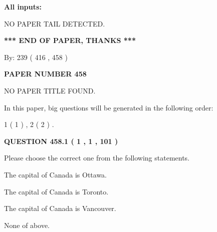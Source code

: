 \documentclass[12pt]{article}
\begin{document}
   
   
   
\noindent\vspace{0.1in}\hspace{-0.08in} {\textbf{\Large{All inputs: }}}
   
   
   
   
\vspace{2.0in} NO PAPER TAIL DETECTED.
   
   
   
   
\vspace{1.0in} 
{\textbf{\large{ *** END OF PAPER, THANKS *** }}} 
   
   
\hspace{1.0in} By: 
 239 ( 416 ,  458 )
   
   
   
   
\newpage 
\setcounter{page}{ 
   458001 } 
   
   
   
   
 {\textbf{ \Large{ PAPER NUMBER  458  }}}
   
   
\vspace{0.2in}
   
   
   
   
   
   
 NO PAPER TITLE FOUND.
   
   
   
\vspace{0.2in}
   
In this paper, big questions will be generated in the following order: 
   
   
   1 ( 1 )
 ,
   2 ( 2 )
 .
  
\vspace{0.2in}
  
{\textbf{\Large{QUESTION
458.1 
 ( 1 , 1 , 101 )
}}}
  
  
Please choose the correct one from the following statements.
 
 
The capital of Canada is Ottawa.
 
 
The capital of Canada is Toronto.
 
 
The capital of Canada is Vancouver.
 
 
 None of above.
 
 
\noindent{}
 
\end{document}
